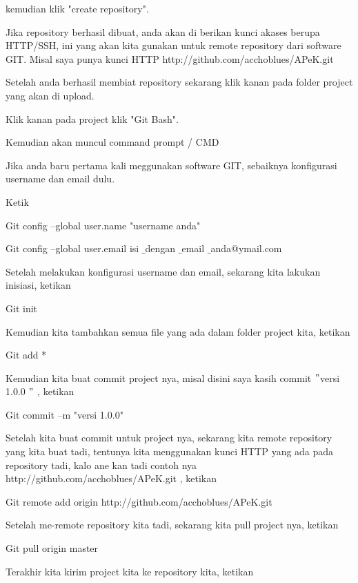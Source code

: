 \noindent 
kemudian klik "create repository". \par
\noindent 
Jika repository berhasil dibuat, anda akan di berikan kunci akases berupa HTTP/SSH, ini yang akan kita gunakan untuk remote repository dari software GIT. Misal saya punya kunci HTTP http://github.com/acchoblues/APeK.git \par
\noindent 
Setelah anda berhasil membiat repository sekarang klik kanan pada folder project yang akan di upload. \par
\noindent 
Klik kanan pada project klik "Git Bash". \par
\noindent 
Kemudian akan muncul command prompt / CMD \par
\noindent 
Jika anda baru pertama kali meggunakan software GIT, sebaiknya konfigurasi username dan email dulu. \par
\noindent 
Ketik \par
\noindent 
Git config --global user.name "username anda"  \par
\noindent 
Git config --global user.email isi $  \_  $dengan $  \_  $email $  \_  $anda@ymail.com  \par
\noindent 
Setelah melakukan konfigurasi username dan email, sekarang kita lakukan inisiasi, ketikan  \par
\noindent 
Git init  \par
\noindent 
Kemudian kita tambahkan semua file yang ada dalam folder project kita, ketikan  \par
\noindent 
Git add *  \par
\noindent 
Kemudian kita buat commit project nya, misal disini saya kasih commit  $ " $versi 1.0.0 $ " $ , ketikan  \par
\noindent 
Git commit –m "versi 1.0.0"  \par
\noindent 
Setelah kita buat commit untuk project nya, sekarang kita remote repository yang kita buat tadi, tentunya kita menggunakan kunci HTTP yang ada pada repository tadi, kalo ane kan tadi contoh nya http://github.com/acchoblues/APeK.git , ketikan \par
\noindent 
Git remote add origin http://github.com/acchoblues/APeK.git  \par
\noindent 
Setelah me-remote repository kita tadi, sekarang kita pull project nya, ketikan  \par
\noindent 
Git pull origin master  \par
\noindent 
Terakhir kita kirim project kita ke repository kita, ketikan  \par
\noindent 
